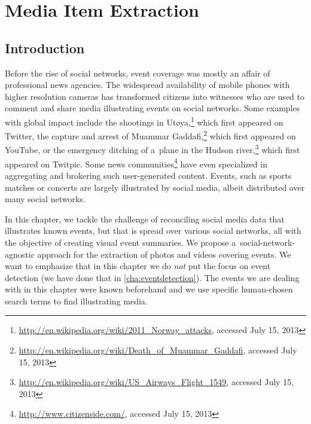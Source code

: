\chapter{Media Item Extraction}
\label{cha:media-item-extraction}

\ifpdf
    \graphicspath{{5_media_item_extraction/figures/PNG/}{5_media_item_extraction/figures/PDF/}{5_media_item_extraction/figures/}}
\else
    \graphicspath{{5_media_item_extraction/figures/EPS/}{5_media_item_extraction/figures/}}
\fi

\section{Introduction}

Before the rise of social networks,
event coverage was mostly an affair of professional news agencies.
The widespread availability of mobile phones
with higher resolution cameras has transformed
citizens into witnesses who are used to comment
and share media illustrating events on social networks.
Some examples with global impact
include the shootings in
Ut{\o}ya,\footnote{\url{http://en.wikipedia.org/wiki/2011_Norway_attacks},
accessed July 15, 2013}
which first appeared on Twitter,
the capture and arrest of Muammar
Gaddafi,\footnote{\url{http://en.wikipedia.org/wiki/Death_of_Muammar_Gaddafi},
accessed July 15, 2013}
which first appeared on YouTube,
or the emergency ditching of a~plane in the Hudson
river,\footnote{\url{http://en.wikipedia.org/wiki/US_Airways_Flight_1549},
accessed July 15, 2013}
which first appeared on Twitpic.
Some news
communities\footnote{\url{http://www.citizenside.com/},
accessed July 15, 2013}
have even specialized in aggregating and brokering
such user-generated content.
Events, such as sports matches or concerts are 
largely illustrated by social media,
albeit distributed over many social networks.

In this chapter, we tackle the challenge of reconciling
social media data that illustrates known events,
but that is spread over various social networks,
all with the objective of creating visual event summaries.
We propose a~social-network-agnostic
approach for the extraction of photos and videos covering events.
We want to emphasize that in this chapter we do \emph{not}
put the focus on event detection (we have done that in \autoref{cha:eventdetection}). 
The events we are dealing with in this chapter
were known beforehand and we use specific
human-chosen search terms to find illustrating media.

